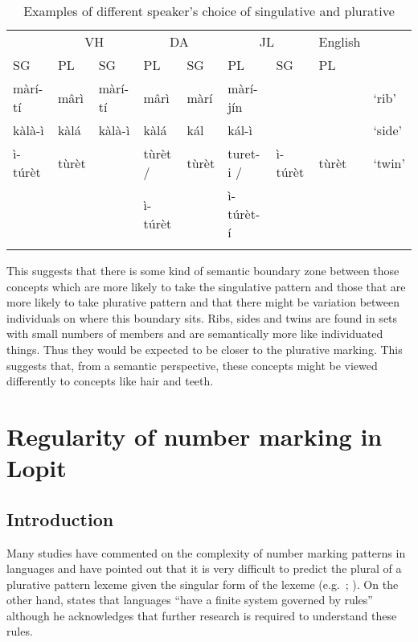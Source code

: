 \documentclass[output=paper]{langsci/langscibook}
\begin{document}
\begin{table}
\begin{tabularx}{\textwidth}{lllllllll}
\lsptoprule

\multicolumn{2}{c}{ {AL}} & \multicolumn{2}{c}{ {VH}} & \multicolumn{2}{c}{ {DA}} & \multicolumn{2}{c}{ {JL}} & {English}\\ \cmidrule(lr){1-2}\cmidrule(lr){3-4}\cmidrule(lr){5-6}\cmidrule(lr){7-8}
{SG} & {PL} & {SG} & {PL} & {SG} & {PL} & {SG} & 
 {PL} & \\ \midrule
 màrí-tí &  m\^{a}rì &  màrí-tí &  m\^{a}rì &  màrí &  màrí-jín &  &  & ‘rib’\\
\tablevspace
 kàlà-ì &  kàlá &  kàlà-ì &  kàlá &  kál &  kál-ì &  &  & ‘side’\\
\tablevspace
 ì-túrèt &  tùrèt &  &  tùrèt / & {tùrèt } & {turet-i /}

&  ì-túrèt &  tùrèt & ‘twin’\\
&&&  ì-túrèt &&  ì-túrèt-í & & \\
\lspbottomrule
\end{tabularx}
\caption{Examples of different speaker’s choice of singulative and plurative}
\label{tab:moodie:8}
\end{table}

This suggests that there is some kind of semantic boundary zone between those concepts which are more likely to take the singulative pattern and those that are more likely to take plurative pattern and that there might be variation between individuals on where this boundary sits. Ribs, sides and twins are found in sets with small numbers of members and are semantically more like individuated things. Thus they would be expected to be closer to the plurative marking. This suggests that, from a semantic perspective, these concepts might be viewed differently to concepts like hair and teeth.

\section{Regularity of number marking in Lopit}\label{sec:moodie:4}


\subsection{Introduction} \label{sec:moodie:4.1}


Many studies have commented on the complexity of number marking patterns in  languages and have pointed out that it is very difficult to predict the plural of a plurative pattern lexeme given the singular form of the lexeme (e.g.\ \citealt[4]{TuckerMpaayei1955}; \citealt[3]{HildersLawrance1957}). On the other hand, \citet[255]{Dimmendaal2000} states that  languages “have a finite system governed by rules” although he acknowledges that further research is required to understand these rules. 
\end{document}

